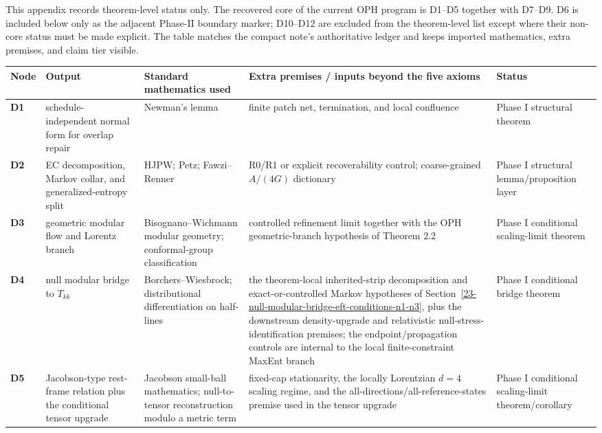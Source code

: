 This appendix records theorem-level status only. The recovered core of the current OPH program is D1--D5 together with D7--D9. D6 is included below only as the adjacent Phase-II boundary marker; D10--D12 are excluded from the theorem-level list except where their non-core status must be made explicit. The table matches the compact note's authoritative ledger and keeps imported mathematics, extra premises, and claim tier visible.

\begingroup
\scriptsize
{\def\LTcaptype{none}
\setlength{\tabcolsep}{2pt}
\begin{longtable}[]{@{}>{\RaggedRight\arraybackslash}p{}>{\RaggedRight\arraybackslash}p{}>{\RaggedRight\arraybackslash}p{}>{\RaggedRight\arraybackslash}p{}>{\RaggedRight\arraybackslash}p{}@{}}
\toprule\noalign{}
Node & Output & Standard mathematics used & Extra premises / inputs beyond the five axioms & Status \\
\midrule\noalign{}
\endhead
\bottomrule\noalign{}
\endlastfoot
\textbf{D1} & schedule-independent normal form for overlap repair & Newman's lemma & finite patch net, termination, and local confluence & Phase I structural theorem \\
\textbf{D2} & EC decomposition, Markov collar, and generalized-entropy split & HJPW; Petz; Fawzi--Renner & R0/R1 or explicit recoverability control; coarse-grained \(A/(4G)\) dictionary & Phase I structural lemma/proposition layer \\
\textbf{D3} & geometric modular flow and Lorentz branch & Bisognano--Wichmann modular geometry; conformal-group classification & controlled refinement limit together with the OPH geometric-branch hypothesis of Theorem 2.2 & Phase I conditional scaling-limit theorem \\
\textbf{D4} & null modular bridge to \(T_{kk}\) & Borchers--Wiesbrock; distributional differentiation on half-lines & the theorem-local inherited-strip decomposition and exact-or-controlled Markov hypotheses of Section~\ref{23-null-modular-bridge-eft-conditions-n1-n3}, plus the downstream density-upgrade and relativistic null-stress-identification premises; the endpoint/propagation controls are internal to the local finite-constraint MaxEnt branch & Phase I conditional bridge theorem \\
\textbf{D5} & Jacobson-type rest-frame relation plus the conditional tensor upgrade & Jacobson small-ball mathematics; null-to-tensor reconstruction modulo a metric term & fixed-cap stationarity, the locally Lorentzian \(d=4\) scaling regime, and the all-directions/all-reference-states premise used in the tensor upgrade & Phase I conditional scaling-limit theorem/corollary \\

\end{longtable}}

